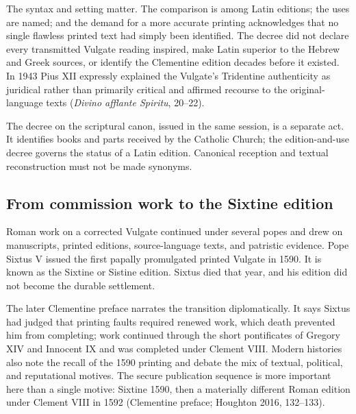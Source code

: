 The syntax and setting matter. The comparison is among Latin editions; the uses are named; and the demand for a more accurate printing acknowledges that no single flawless printed text had simply been identified. The decree did not declare every transmitted Vulgate reading inspired, make Latin superior to the Hebrew and Greek sources, or identify the Clementine edition decades before it existed. In 1943 Pius XII expressly explained the Vulgate's Tridentine authenticity as juridical rather than primarily critical and affirmed recourse to the original-language texts (\emph{Divino afflante Spiritu}, 20--22).


The decree on the scriptural canon, issued in the same session, is a separate act. It identifies books and parts received by the Catholic Church; the edition-and-use decree governs the status of a Latin edition. Canonical reception and textual reconstruction must not be made synonyms.

\subsection{From commission work to the Sixtine edition}

Roman work on a corrected Vulgate continued under several popes and drew on manuscripts, printed editions, source-language texts, and patristic evidence. Pope Sixtus V issued the first papally promulgated printed Vulgate in 1590. It is known as the Sixtine or Sistine edition. Sixtus died that year, and his edition did not become the durable settlement.

The later Clementine preface narrates the transition diplomatically. It says Sixtus had judged that printing faults required renewed work, which death prevented him from completing; work continued through the short pontificates of Gregory XIV and Innocent IX and was completed under Clement VIII. Modern histories also note the recall of the 1590 printing and debate the mix of textual, political, and reputational motives. The secure publication sequence is more important here than a single motive: Sixtine 1590, then a materially different Roman edition under Clement VIII in 1592 (Clementine preface; Houghton 2016, 132--133).

